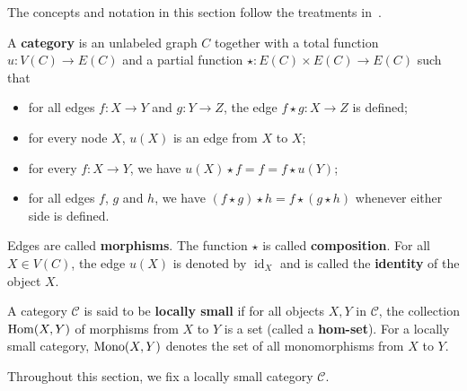  The concepts and notation in this section follow the treatments in~\cite{pierce1991basic,barr1990category}.

\begin{definition}
    \label{def:cat}
    A \textbf{category} is an unlabeled graph \( C \) together with a total function \( u : V(C) \to E(C) \) and a partial function \( \star: E(C) \times E(C) \to E(C) \) such that 
        \begin{itemize}
            \item for all edges \( f:X \to Y \) and \( g:Y \to Z \), the edge \( f \star g :X \to Z \) is defined; 
            \item  for every node \( X \), \( u(X) \) is an edge from \( X \) to \( X \);
            \item for every \( f:X \to Y \), we have \(u(X) \star f = f = f \star u(Y)\);
            \item for all edges \( f \), \( g \) and \(h\), we have \( (f \star g) \star h = f \star (g \star h) \) whenever either side is defined.
        \end{itemize}
    Edges are called \textbf{morphisms}. The function $\star$ is called \textbf{composition}. For all \( X \in V(C) \), the edge \( u(X) \) is denoted by \( \operatorname{id}_X \) and is called the \textbf{identity} of the object \( X \).
\end{definition} 
\begin{definition}
    A category \(\mathcal{C}\) is said to be \textbf{locally small} if for all objects \(X,Y\) in \(\mathcal{C}\), the collection $\operatorname{Hom}(X,Y)$ of morphisms from \(X\) to \(Y\) is a set (called a \textbf{hom-set}). For a locally small category, $\operatorname{Mono}(X,Y)$ denotes the set of all monomorphisms from $X$ to $Y$.
\end{definition}
 Throughout this section, we fix a locally small category \( \mathcal{C} \).
